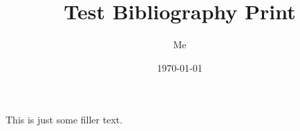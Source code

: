 \documentclass[letterpaper]{article}
\begin{document}
\title{Test Bibliography Print}
\author{Me}
\date{\today}
\maketitle
This is just some filler text.\cite{caro1975power}
\nocite{*} %
\printbibliography
\end{document}
